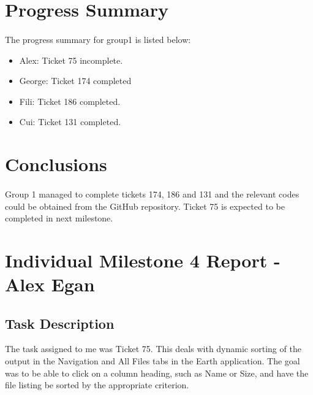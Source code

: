 \documentclass[10pt,a4,oneside]{article}
\begin{document}
\section{Progress Summary}

\paragraph{}
The progress summary for group1 is listed below:

\begin{itemize}
 \item Alex: Ticket 75 incomplete.
 \item George: Ticket 174 completed
 \item Fili: Ticket 186 completed.
 \item Cui: Ticket 131 completed.
\end{itemize}

\newpage

\section{Conclusions}

\paragraph{}
\noindent Group 1 managed to complete tickets 174, 186 and 131 and the relevant codes could be obtained from the GitHub repository. Ticket 75 is expected to be completed in next milestone.

\newpage

\section{Individual Milestone 4 Report - Alex Egan}

\subsection*{Task Description}
The task assigned to me was Ticket 75. This deals with dynamic sorting of the output in the Navigation and All Files tabs in the Earth application. The goal was to be able to click on a column heading, such as Name or Size, and have the file listing be sorted by the appropriate criterion.
\end{document}
